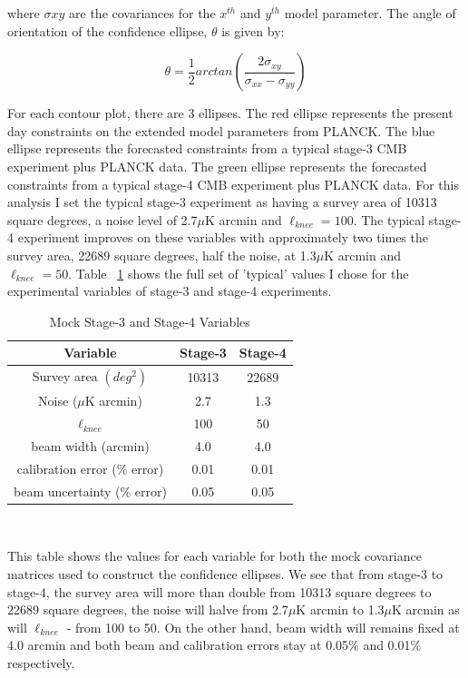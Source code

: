 where $\sigma{xy}$ are the covariances for the $x^{th}$ and $y^{th}$ model parameter. The angle of orientation of the confidence ellipse, $\theta$ is given by:

\begin{equation}
\theta = \frac{1}{2}arctan(\frac{2\sigma_{xy}}{\sigma_{xx}-\sigma_{yy}})
\end{equation}

For each contour plot, there are 3 ellipses. The red ellipse represents the present day constraints on the extended model parameters from PLANCK. The blue ellipse represents the forecasted constraints from a typical stage-3 CMB experiment plus PLANCK data. The green ellipse represents the forecasted constraints from a typical stage-4 CMB experiment plus PLANCK data. For this analysis I set the typical stage-3 experiment as having a survey area of 10313 square degrees, a noise level of 2.7$\mu$K arcmin and $\ell_{knee} = 100$. The typical stage-4 experiment improves on these variables with approximately two times the survey area, 22689 square degrees, half the noise, at 1.3$\mu$K arcmin and $\ell_{knee} = 50$. Table ~\ref{table: stage-stats} shows the full set of 'typical' values I chose for the experimental variables of stage-3 and stage-4 experiments.

\begin{table}[h]
\centering
\caption{Mock Stage-3 and Stage-4 Variables}

\label{table: stage-stats}
\begin{tabular}{l|l|l}
\multicolumn{1}{c}{Variable} & \multicolumn{1}{|c}{Stage-3} & \multicolumn{1}{|c}{Stage-4} \\ \hline
\multicolumn{1}{c}{Survey area $(deg^2)$} & \multicolumn{1}{|c}{10313} & \multicolumn{1}{|c}{22689}  \\
\multicolumn{1}{c}{Noise ($\mu$K arcmin)} & \multicolumn{1}{|c}{2.7} & \multicolumn{1}{|c}{1.3}  \\
\multicolumn{1}{c}{$\ell_{knee}$} & \multicolumn{1}{|c}{100} & \multicolumn{1}{|c}{50} \\
\multicolumn{1}{c}{beam width (arcmin)} & \multicolumn{1}{|c}{4.0} & \multicolumn{1}{|c}{4.0}   \\
\multicolumn{1}{c}{calibration error (\% error)} & \multicolumn{1}{|c}{0.01} & \multicolumn{1}{|c}{0.01} \\
\multicolumn{1}{c}{beam uncertainty (\% error)} & \multicolumn{1}{|c}{0.05} & \multicolumn{1}{|c}{0.05}
\end{tabular}
\\
\begin{flushleft}
This table shows the values for each variable for both the mock covariance matrices used to construct the confidence ellipses. We see that from stage-3 to stage-4, the survey area will more than double from 10313 square degrees to 22689 square degrees, the noise will halve from 2.7$\mu$K arcmin to 1.3$\mu$K arcmin as will $\ell_{knee}$ - from 100 to 50. On the other hand, beam width will remains fixed at 4.0 arcmin and both beam and calibration errors stay at 0.05$\%$ and 0.01$\%$ respectively.
\end{flushleft}
\end{table}

